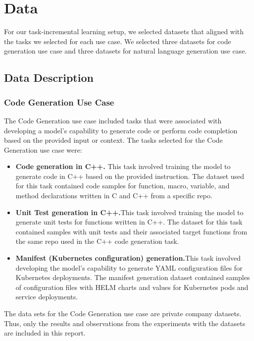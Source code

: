 \section{Data} \label{Data}
For our task-incremental learning setup, we selected datasets that aligned with the tasks we selected for each use case. We selected three datasets for code generation use case and three datasets for natural language generation use case.

\subsection{Data Description} \label{Data Description}
\subsubsection{Code Generation Use Case} \label{Code Generation Use Case}
The Code Generation use case included tasks that were associated with developing a model’s capability to generate code or perform code completion based on the provided input or context. 
The tasks selected for the Code Generation use case were:
\begin{itemize}
\item \textbf{Code generation in C++.} This task involved training the model to generate code in C++ based on the provided instruction. The dataset used for this task contained code samples for function, macro, variable, and method declarations written in C and C++ from a specific repo.
\item \textbf{Unit Test generation in C++.}This task involved training the model to generate unit tests for functions written in C++. The dataset for this task contained samples with unit tests and their associated target functions from the same repo used in the C++ code generation task.
\item \textbf{Manifest (Kubernetes configuration) generation.}This task involved developing the model’s capability to generate YAML configuration files for Kubernetes deployments. The manifest generation dataset contained samples of configuration files with HELM charts and values for Kubernetes pods and service deployments.
\end{itemize}
The data sets for the Code Generation use case are private company datasets. Thus, only the results and observations from the experiments with the datasets are included in this report. 

